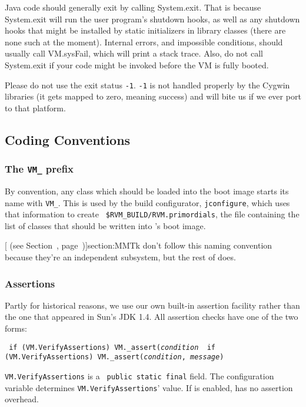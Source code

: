 Java code should generally exit by calling System.exit.  That is
because System.exit will run the user program's shutdown hooks, as
well as any shutdown hooks that might be installed by static
initializers in library classes (there are none such at the moment).
Internal errors, and impossible conditions, should usually call
VM.sysFail, which will print a stack trace.  Also, do not call
System.exit if your code might be invoked before the VM is fully
booted.

Please do not use the exit status \texttt{-1}.  \texttt{-1} is not
handled properly by the Cygwin libraries (it gets mapped to zero,
meaning success) and will bite us if we ever port to that platform.

\subsection{Coding Conventions}

\subsubsection{The {\tt VM\_} prefix}

By convention, any class which should be loaded into the boot image
starts its name with {\tt VM\_}.  This is used by the build configurator,
{\tt jconfigure}, which uses that information to create {\tt
\$RVM\-\_\-BUILD\-/\-R\-V\-M\-.pri\-mor\-di\-als}, the file containing the list of classes
that should be written into \jrvm{}'s  boot image.

[ (see Section~\Ref, page~\Pageref)]{section:MMTk} don't follow this naming convention
because they're an independent subsystem, but the rest of \jrvm{} does.

\subsubsection{Assertions}
\label{assertions}

Partly for historical reasons, we use our own built-in assertion
facility rather than the one that appeared in Sun\Rweb{}'s JDK 1.4.   All
assertion checks have one of the two forms:
\begin{example}
\tt{}    if (VM.VerifyAssertions)  VM.\_assert({\it condition}
\tt{}    if (VM.VerifyAssertions)  VM.\_assert({\it condition}, {\it message})
\end{example}
{\tt VM.VerifyAssertions} is a {\tt 
public static final} field.  The 
configuration variable determines {\tt VM.VerifyAssertions}' value.
If  is enabled, \jrvm{} has no assertion
overhead. 

